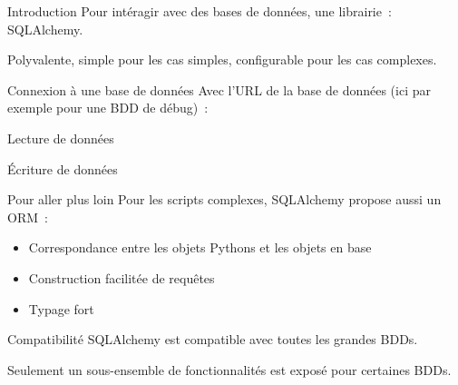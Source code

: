 \begin{frame}{Introduction}
  Pour intéragir avec des bases de données, une librairie~: SQLAlchemy.

  Polyvalente, simple pour les cas simples, configurable pour les cas complexes.
\end{frame}

\begin{frame}{Connexion à une base de données}
  Avec l'URL de la base de données (ici par exemple pour une BDD de débug)~:

\end{frame}

\begin{frame}{Lecture de données}
\end{frame}

\begin{frame}{Écriture de données}
\end{frame}

\begin{frame}{Pour aller plus loin}
  Pour les scripts complexes, SQLAlchemy propose aussi un ORM~:

  \begin{itemize}
    \item Correspondance entre les objets Pythons et les objets en base
    \item Construction facilitée de requêtes
    \item Typage fort
  \end{itemize}
\end{frame}

\begin{frame}{Compatibilité}
  SQLAlchemy est compatible avec toutes les grandes BDDs.

  Seulement un sous-ensemble de fonctionnalités est exposé pour certaines BDDs.
\end{frame}
